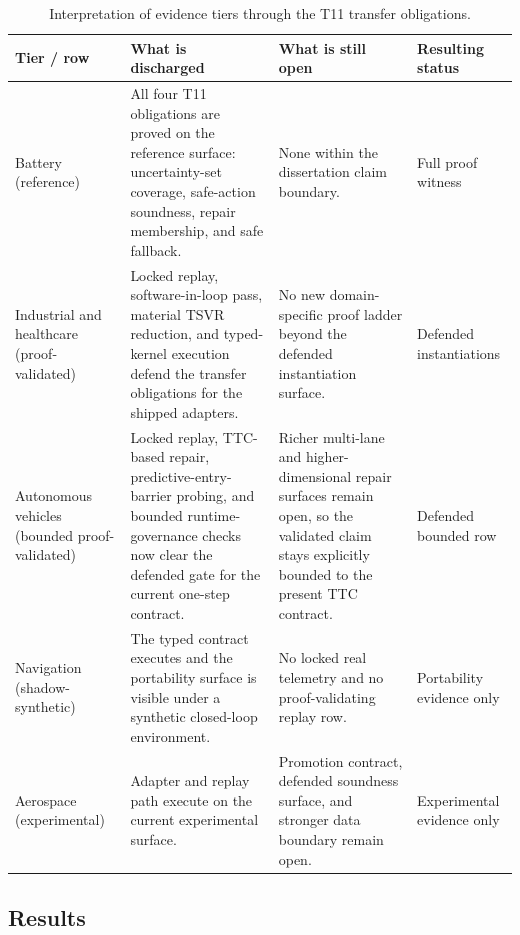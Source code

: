 \begin{table}[htbp]
\centering
\caption{Interpretation of evidence tiers through the T11 transfer obligations.}
\label{tab:t11-tier-interpretation}
\begin{tabular}{p{2.6cm}p{3.9cm}p{3.5cm}p{1.9cm}}
\toprule
\textbf{Tier / row} & \textbf{What is discharged} & \textbf{What is still open} & \textbf{Resulting status} \\
\midrule
Battery (reference) & All four T11 obligations are proved on the reference surface: uncertainty-set coverage, safe-action soundness, repair membership, and safe fallback. & None within the dissertation claim boundary. & Full proof witness \\
\addlinespace
Industrial and healthcare (proof-validated) & Locked replay, software-in-loop pass, material TSVR reduction, and typed-kernel execution defend the transfer obligations for the shipped adapters. & No new domain-specific proof ladder beyond the defended instantiation surface. & Defended instantiations \\
\addlinespace
Autonomous vehicles (bounded proof-validated) & Locked replay, TTC-based repair, predictive-entry-barrier probing, and bounded runtime-governance checks now clear the defended gate for the current one-step contract. & Richer multi-lane and higher-dimensional repair surfaces remain open, so the validated claim stays explicitly bounded to the present TTC contract. & Defended bounded row \\
\addlinespace
Navigation (shadow-synthetic) & The typed contract executes and the portability surface is visible under a synthetic closed-loop environment. & No locked real telemetry and no proof-validating replay row. & Portability evidence only \\
\addlinespace
Aerospace (experimental) & Adapter and replay path execute on the current experimental surface. & Promotion contract, defended soundness surface, and stronger data boundary remain open. & Experimental evidence only \\
\bottomrule
\end{tabular}
\end{table}

\subsection{Results}




